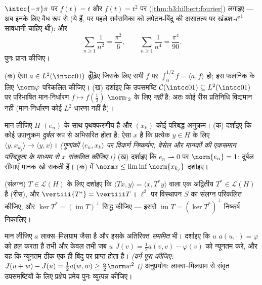 \begin{exercise}[$\star\star$]\label{exo:b3:hilbert:5}
$\intcc{-\pi}\pi$ पर $f(t) = t$ और $f(t) = t^2$ पर  (\cref{thm:b3:hilbert:fourier}) लगाइए --- अब इनके लिए
वैध रूप से (ये  हैं, पर पहले सर्वसमिका को लपेटन-बिंदु की असांतत्य
पर खंडशः-$\mathcal C^1$ सावधानी चाहिए थी): और
\[
\sum_{n\geq1}\frac1{n^2} = \frac{\pi^2}6,
\qquad
\sum_{n\geq1}\frac1{n^4} = \frac{\pi^4}{90} .
\]
पुनः प्राप्त कीजिए।
\end{exercise}

\begin{exercise}[$\star\star$]\label{exo:b3:hilbert:6}
(क) ऐसा $a \in L^2(\intcc01)$ ढूँढ़िए जिसके लिए सभी $f$ पर $\int_0^{1/2}f =
\langle a, f\rangle$ हो; इस फलनिक
के लिए $\norm\varphi$ परिकलित कीजिए।
(ख) दर्शाइए कि उपसमष्टि $\mathcal C(\intcc01) \subseteq
L^2(\intcc01)$ पर परिभाषित मान-निर्धारण $f \mapsto f(\frac12)$
$\norm\cdot_2$ के लिए  \emph{नहीं} है: अतः कोई रीस प्रतिनिधि विद्यमान
नहीं (मान-निर्धारण कोई $L^2$ धारणा नहीं है)।
\end{exercise}

\begin{exercise}[$\star\star\star$]\label{exo:b3:hilbert:7}
मान लीजिए $H$  $(e_n)$ के साथ पृथक्करणीय है और $(x_k)$
कोई परिबद्ध अनुक्रम।
(क) दर्शाइए कि कोई उपानुक्रम \emph{दुर्बल} रूप से अभिसरित होता है:
ऐसा $x$ है कि प्रत्येक $y \in H$ के लिए $\langle y, x_{k_j}\rangle \to \langle y,
x\rangle$। \emph{(गुणांकों
$\langle e_n, x_k\rangle$ पर विकर्ण निष्कर्षण; बेसेल और मानकों की एकसमान परिबद्धता के
माध्यम से $x$ संकलित कीजिए।)}
(ख) दर्शाइए कि $e_n \rightharpoonup 0$ पर $\norm{e_n} = 1$: दुर्बल सीमाएँ मानक खो सकती हैं।
(क) में $\norm x \leq
\liminf\norm{x_{k_j}}$ दर्शाइए।
\end{exercise}

\begin{exercise}[$\star\star$]\label{exo:b3:hilbert:8}
(संलग्न) $T \in \mathcal L(H)$ के लिए दर्शाइए कि $\langle Tx, y\rangle = \langle
x, T^*y\rangle$ वाला एक अद्वितीय $T^* \in \mathcal L(H)$ है
(रीस), और $\vertiii{T^*} = \vertiii T$। $\ell^2$ पर विस्थापन $S$ का संलग्न परिकलित कीजिए,
और $\ker T^* = (\operatorname{im}T)^\perp$ सिद्ध कीजिए --- इससे $\overline{\operatorname{im}T} = (\ker T^*)^\perp$ निष्कर्ष निकालिए।
\end{exercise}

\begin{exercise}[$\star\star$]\label{exo:b3:hilbert:9}
मान लीजिए $a$ लाक्स--मिलग्राम जैसा है और इसके अतिरिक्त
\emph{सममित} भी। दर्शाइए कि $u$ $a(u, \cdot) = \varphi$ को हल करता है तभी और केवल
तभी जब $u$ $J(v) = \frac12a(v, v) - \varphi(v)$ को न्यूनतम करे, और यह कि न्यूनतम ठीक एक ही
बिंदु पर प्राप्त होता है। \emph{(वर्ग पूरा कीजिए: $J(u + w) - J(u) = \frac12a(w,w) \geq
\frac\alpha2\norm w^2$।)}
अनुप्रयोग: लाक्स--मिलग्राम से संवृत उपसमष्टियों के लिए प्रक्षेप
प्रमेय पुनः व्युत्पन्न कीजिए।
\end{exercise}

